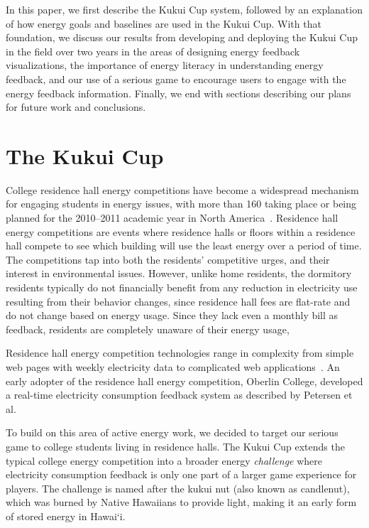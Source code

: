 \documentclass[10pt, conference, compsocconf]{IEEEtran}
\newcommand{\Hawaii}{Hawai`i\xspace}
\begin{document}
In this paper, we first describe the Kukui Cup system, followed by an explanation of how energy goals and baselines are used in the Kukui Cup. With that foundation, we discuss our results from developing and deploying the Kukui Cup in the field over two years in the areas of designing energy feedback visualizations, the importance of energy literacy in understanding energy feedback, and our use of a serious game to encourage users to engage with the energy feedback information. Finally, we end with sections describing our plans for future work and conclusions.


\section{The Kukui Cup}

College residence hall energy competitions have become a widespread mechanism for engaging students in energy issues, with more than 160 taking place or being planned for the 2010--2011 academic year in North America~\cite{Hodge2010}. Residence hall energy competitions are events where residence halls or floors within a residence hall compete to see which building will use the least energy over a period of time. The competitions tap into both the residents' competitive urges, and their interest in environmental issues. However, unlike home residents, the dormitory residents typically do not financially benefit from any reduction in electricity use resulting from their behavior changes, since residence hall fees are flat-rate and do not change based on energy usage. Since they lack even a monthly bill as feedback, residents are completely unaware of their energy usage, 

Residence hall energy competition technologies range in complexity from simple web pages with weekly electricity data to complicated web applications~\cite[pp. 6--11]{csdl2-11-01}. An early adopter of the residence hall energy competition, Oberlin College, developed a real-time electricity consumption feedback system as described by Petersen et al.~\cite{petersen-dorm-energy-reduction}

To build on this area of active energy work, we decided to target our serious game to college students living in residence halls. The Kukui Cup extends the typical college energy competition into a broader energy \emph{challenge} where electricity consumption feedback is only one part of a larger game experience for players. The challenge is named after the kukui nut (also known as candlenut), which was burned by Native Hawaiians to provide light, making it an early form of stored energy in \Hawaii.
\end{document}
